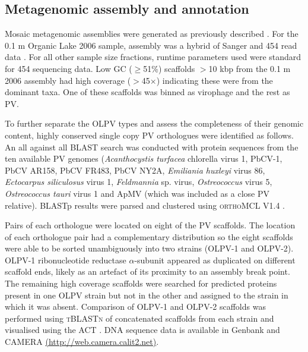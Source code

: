 \subsection{Metagenomic assembly and annotation}
Mosaic metagenomic assemblies were generated as previously described \cite{Ng2010a, Lauro2011}. 
For the 0.1 \textmu{}m Organic Lake 2006 sample, assembly was a hybrid of Sanger and 454 read data . 
For all other sample size fractions, runtime parameters used were standard for 454 sequencing data. 
Low GC ($\ge$51\%) scaffolds $>$10 kbp from the 0.1 \textmu{}m 2006 assembly had high coverage ($>$45$\times$) indicating these were from the dominant taxa. 
One of these scaffolds was binned as virophage and the rest as \ac{PV}. 

To further separate the \ac{OLPV} types and assess the completeness of their genomic content, highly conserved single copy PV orthologues were identified as follows. 
An all against all \ac{BLAST} search was conducted with protein sequences from the ten available \ac{PV} genomes 
(\emph{Acanthocystis turfacea} chlorella virus 1, PbCV-1, PbCV AR158, PbCV FR483, PbCV NY2A, \emph{Emiliania huxleyi} virus 86, \emph{Ectocarpus siliculosus} virus 1, \emph{Feldmannia} sp. virus, \emph{Ostreococcus} virus 5, \emph{Ostreococcus tauri} virus 1 and \ac{ApMV} (which was included as a close \ac{PV} relative). 
\ac{BLAST}p results were parsed and clustered using \textsc{orthoMCL} V1.4 \cite{Li2003, Chen2006}. 

Pairs of each orthologue were located on eight of the \ac{PV} scaffolds. 
The location of each orthologue pair had a complementary distribution so the eight scaffolds were able to be sorted unambiguously into two strains (\ac{OLPV}-1 and \ac{OLPV}-2). 
\ac{OLPV}-1 ribonucleotide reductase $\alpha$-subunit appeared as duplicated on different scaffold ends, likely as an artefact of its proximity to an assembly break point. 
The remaining high coverage scaffolds were searched for predicted proteins present in one \ac{OLPV} strain but not in the other and assigned to the strain in which it was absent. 
Comparison of \ac{OLPV}-1 and \ac{OLPV}-2 scaffolds was performed using \textsc{tBLASTn} of concatenated scaffolds from each strain and visualised using the \ac{ACT} \cite{Carver2005}. 
\textsc{DNA} sequence data is available in Genbank and \ac{CAMERA} \url{(http://web.camera.calit2.net)}.

